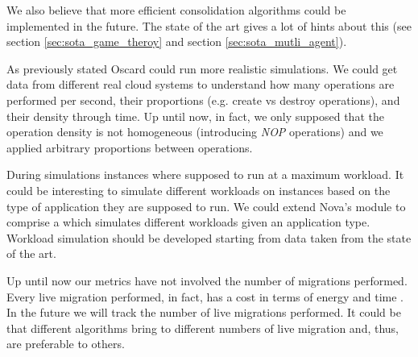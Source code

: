 We also believe that more efficient consolidation algorithms could be implemented in the future. The state of the art gives a lot of hints about this (see section \ref{sec:sota_game_theroy} and section \ref{sec:sota_mutli_agent}). 

As previously stated Oscard could run more realistic simulations. We could get data from different real cloud systems to understand how many operations are performed per second, their proportions (e.g. create vs destroy operations), and their density through time. Up until now, in fact, we only supposed that the operation density is not homogeneous (introducing \textit{NOP} operations) and we applied arbitrary proportions between operations.

During simulations instances where supposed to run at a maximum workload. It could be interesting to simulate different workloads on instances based on the type of application they are supposed to run. We could extend Nova's  module to comprise a  which simulates different workloads given an application type. Workload simulation should be developed starting from data taken from the state of the art.

Up until now our metrics have not involved the number of migrations performed. Every live migration performed, in fact, has a cost in terms of energy and time . In the future we will track the number of live migrations performed. It could be that different algorithms bring to different numbers of live migration and, thus, are preferable to others.

